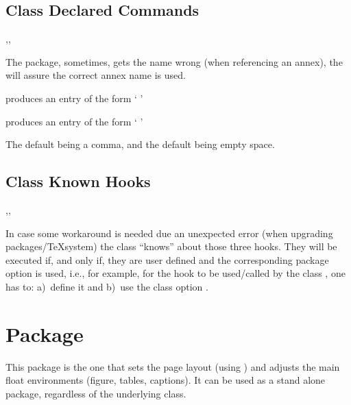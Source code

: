 \documentclass[article,nogeometry,english,tocdepth=3,secdepth=3]{ufrgscca} %
\begin{document}
\subsection{Class Declared Commands}
\begin{codedescribe}{\autonameref,\annexref,\autoannexref}
	\begin{codesyntax}%
	\end{codesyntax}
The  package, sometimes, gets the \tsmacro{\autoref}{} name wrong (when referencing an annex), the  will assure the correct annex name is used.

 produces an entry of the form `   '

 produces an entry of the form `   '

The default  being a comma, and the default  being empty space.

\end{codedescribe}

\subsection{Class Known Hooks}
\begin{codedescribe}{\miktexHack,\overleafHack,\livetexHack}
    \begin{codesyntax}%
        \tsmacro{\miktexHack}{}
        \tsmacro{\overleafHack}{}
        \tsmacro{\livetexHack}{}
    \end{codesyntax}
    In case some workaround is needed due an unexpected error (when upgrading packages/\TeX system) the class “knows” about those three hooks.
    They will be executed if, and only if, they are user defined and the corresponding package option is used, i.e., for example, for the hook \tsmacro{\miktexHack}{} to be used/called by the class , one has to: a)~define it and b)~use the class option .
\end{codedescribe}


\section{ Package}
This package is the one that sets the page layout (using ) and adjusts the main float environments (figure, tables, captions).
It can be used as a stand alone package, regardless of the underlying class.
\end{document}
